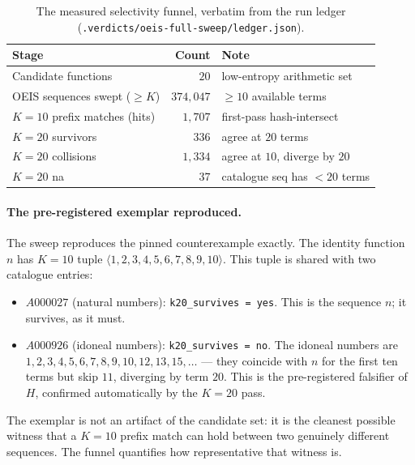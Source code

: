 \documentclass[11pt,a4paper]{article}
\newcommand{\Kten}{K\!=\!10}
\newcommand{\Ktwenty}{K\!=\!20}
\theoremstyle{definition}
\begin{document}
\begin{table}[h]
\centering
\caption{The measured selectivity funnel, verbatim from the run ledger
(\texttt{.verdicts/oeis-full-sweep/ledger.json}).}
\label{tab:funnel}
\begin{tabular}{@{}lrl@{}}
\toprule
\textbf{Stage} & \textbf{Count} & \textbf{Note}\\
\midrule
Candidate functions             & $20$        & low-entropy arithmetic set\\
OEIS sequences swept ($\ge K$)   & $374{,}047$ & $\ge 10$ available terms\\
$\Kten$ prefix matches (hits)    & $1{,}707$   & first-pass hash-intersect\\
\quad $\Ktwenty$ survivors       & $336$       & agree at $20$ terms\\
\quad $\Ktwenty$ collisions      & $1{,}334$   & agree at $10$, diverge by $20$\\
\quad $\Ktwenty$ na              & $37$        & catalogue seq has $<20$ terms\\
\bottomrule
\end{tabular}
\end{table}

\paragraph{The pre-registered exemplar reproduced.} The sweep reproduces the
pinned counterexample exactly. The identity function $n$ has $\Kten$ tuple
$\langle 1,2,3,4,5,6,7,8,9,10\rangle$. This tuple is shared with two catalogue
entries:
\begin{itemize}
  \item $A000027$ (natural numbers): \texttt{k20\_survives = yes}. This is the
  sequence $n$; it survives, as it must.
  \item $A000926$ (idoneal numbers): \texttt{k20\_survives = no}. The idoneal
  numbers are $1,2,3,4,5,6,7,8,9,10,12,13,15,\dots$ --- they coincide with $n$
  for the first ten terms but skip $11$, diverging by term $20$. This is the
  pre-registered falsifier of $H$, confirmed automatically by the $\Ktwenty$
  pass.
\end{itemize}
The exemplar is not an artifact of the candidate set: it is the cleanest
possible witness that a $\Kten$ prefix match can hold between two genuinely
different sequences. The funnel quantifies how representative that witness is.

\end{document}
